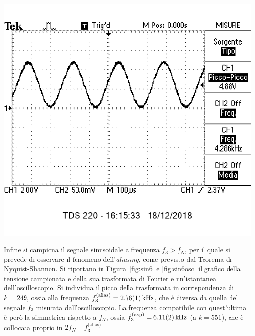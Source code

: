 \documentclass[10pt,oneside,a4paper]{article}
\newenvironment{Figure}
  {\par\medskip\noindent\minipage{\linewidth}}
  {\endminipage\par\medskip}
\begin{document}
\begin{multicols}{2}
\begin{Figure}
	\begin{center}
	\includegraphics[width=0.8\linewidth]{sin42osc}
	\label{fig:sin42osc}
	\end{center}
\end{Figure}

Infine si campiona il segnale sinusoidale a frequenza $f_3 > f_N$, per il quale si prevede di osservare il fenomeno dell'\emph{aliasing}, come previsto dal Teorema di Nyquist-Shannon. Si riportano in Figura~\ref{fig:sin6} e \ref{fig:sin6osc} il grafico della tensione campionata e della sua trasformata di Fourier e un'istantanea dell'oscilloscopio. Si individua il picco della trasformata in corrispondenza di $k = 249$, ossia alla frequenza $f_3^\text{(alias)} = \SI{2.76 \pm 0.01}{\kilo\Hz}$, che è diversa da quella del segnale $f_3$ misurata dall'oscilloscopio. La frequenza compatibile con quest'ultima è però la simmetrica rispetto a $f_N$, ossia $f_3^\text{(exp)} = \SI{6.11 \pm 0.02}{\kilo\Hz}$ (a $k=551$), che è collocata proprio in $2f_N-f_3^\text{(alias)}$.


\end{multicols}
\end{document}

